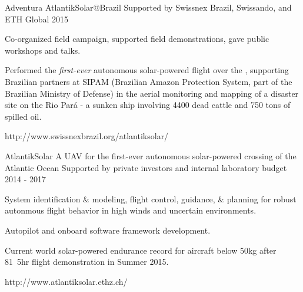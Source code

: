 \begin{cventries}
\cvprojwideentry
  	{Adventura AtlantikSolar@Brazil} %
  	{} %
    {Supported by Swissnex Brazil, Swissando, and ETH Global} %
    {2015} %
    {
      \begin{cvitems} %
        \item {Co-organized field campaign, supported field demonstrations, gave public workshops and talks.}
        \item {Performed the \emph{first-ever} autonomous solar-powered flight over the , supporting Brazilian partners at SIPAM (Brazilian Amazon Protection System, part of the Brazilian Ministry of Defense) in the aerial monitoring and mapping of a disaster site on the Rio Pará - a sunken ship involving 4400 dead cattle and 750 tons of spilled oil.}
      \end{cvitems}
    } %
    {http://www.swissnexbrazil.org/atlantiksolar/} %
    {\showprojectdescriptions}
    {}

\cvprojwideentry
  	{AtlantikSolar} %
  	{A UAV for the first-ever autonomous solar-powered crossing of the Atlantic Ocean} %
    {Supported by private investors and internal laboratory budget} %
    {2014 - 2017} %
    {
      \begin{cvitems} %
        \item {System identification \& modeling, flight control, guidance, \& planning for robust autonmous flight behavior in high winds and uncertain environments.}
        \item {Autopilot and onboard software framework development.}
        \item {Current world solar-powered endurance record for aircraft below \unit{50}{kg} after \unit{81.5}{hr} flight demonstration in Summer 2015.}
      \end{cvitems}
    } %
    {http://www.atlantiksolar.ethz.ch/} %
    {\showprojectdescriptions}
    {}


\end{cventries}
